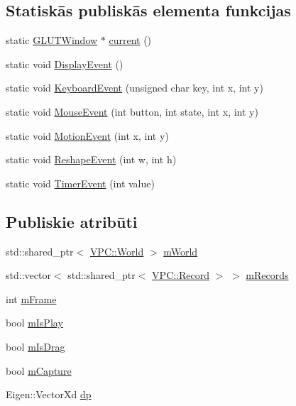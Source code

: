 \subsection*{Statiskās publiskās elementa funkcijas}
\begin{DoxyCompactItemize}
\item 
static \hyperlink{class_v_p_c_1_1_g_u_i_1_1_g_l_u_t_window}{G\+L\+U\+T\+Window} $\ast$ \hyperlink{class_v_p_c_1_1_g_u_i_1_1_g_l_u_t_window_ac04192559c661a6bc954609807df477d}{current} ()
\item 
static void \hyperlink{class_v_p_c_1_1_g_u_i_1_1_g_l_u_t_window_a8874ae9e61f82863cec3b3524c3b0d33}{Display\+Event} ()
\item 
static void \hyperlink{class_v_p_c_1_1_g_u_i_1_1_g_l_u_t_window_ad94b80f2d5d0d032aac9ee71b6fdcf9b}{Keyboard\+Event} (unsigned char key, int x, int y)
\item 
static void \hyperlink{class_v_p_c_1_1_g_u_i_1_1_g_l_u_t_window_ae838963ea1a595625bddfa31dd9cbabd}{Mouse\+Event} (int button, int state, int x, int y)
\item 
static void \hyperlink{class_v_p_c_1_1_g_u_i_1_1_g_l_u_t_window_a962cbc03bcbb5a0541978ec3630f65a6}{Motion\+Event} (int x, int y)
\item 
static void \hyperlink{class_v_p_c_1_1_g_u_i_1_1_g_l_u_t_window_a584bc6119237804393bc403de78031a3}{Reshape\+Event} (int w, int h)
\item 
static void \hyperlink{class_v_p_c_1_1_g_u_i_1_1_g_l_u_t_window_a3dd7ed12ee68dea02946415292139a0e}{Timer\+Event} (int value)
\end{DoxyCompactItemize}
\subsection*{Publiskie atribūti}
\begin{DoxyCompactItemize}
\item 
std\+::shared\+\_\+ptr$<$ \hyperlink{class_v_p_c_1_1_world}{V\+P\+C\+::\+World} $>$ \hyperlink{class_v_p_c_1_1_g_u_i_1_1_sim_window_a8a2dc03c2b159164e3a1d27e6de8774d}{m\+World}
\item 
std\+::vector$<$ std\+::shared\+\_\+ptr$<$ \hyperlink{class_v_p_c_1_1_record}{V\+P\+C\+::\+Record} $>$ $>$ \hyperlink{class_v_p_c_1_1_g_u_i_1_1_sim_window_ac03e0d1150d2500065462383074d38df}{m\+Records}
\item 
int \hyperlink{class_v_p_c_1_1_g_u_i_1_1_sim_window_a639a2dd01463388074a24d18d6144832}{m\+Frame}
\item 
bool \hyperlink{class_v_p_c_1_1_g_u_i_1_1_sim_window_a8c6442f9906e2c458de626825dd477d7}{m\+Is\+Play}
\item 
bool \hyperlink{class_v_p_c_1_1_g_u_i_1_1_sim_window_a1cc866f5524184bbd8e1a2e061b3fe7c}{m\+Is\+Drag}
\item 
bool \hyperlink{class_v_p_c_1_1_g_u_i_1_1_sim_window_aba16bb9ad6a9ad532b1c5e5e0951953d}{m\+Capture}
\item 
Eigen\+::\+Vector\+Xd \hyperlink{class_v_p_c_1_1_g_u_i_1_1_sim_window_a144f2ee38a2a5e72b3b7d9d2505bd23e}{dp}
\end{DoxyCompactItemize}

